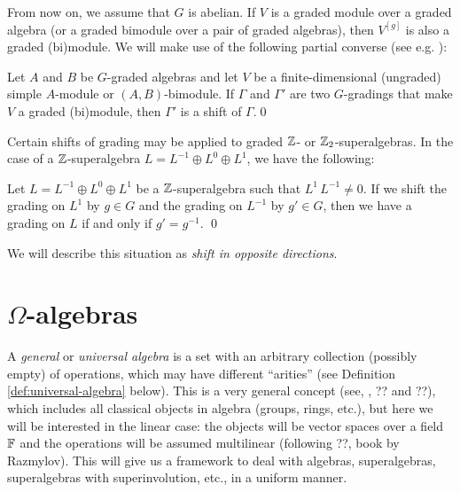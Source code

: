 From now on, we assume that $G$ is abelian.
If $V$ is a graded module over a graded algebra (or a graded bimodule over a pair of graded algebras), then $V^{[g]}$ is also a graded (bi)module. 
We will make use of the following partial converse (see e.g. \cite[Proposition 3.5]{paper-Qn}):

\begin{lemma}\label{lemma:simplebimodule}
	Let $A$ and $B$ be $G$-graded algebras and let $V$ be a finite-dimensional (ungraded) simple $A$-module or $(A,B)$-bimodule.  If $\Gamma$ and $\Gamma'$ are  two $G$-gradings that make $V$ a graded (bi)module, then $\Gamma'$ is a  shift of $\Gamma$.\qed
\end{lemma}

Certain shifts of grading may be applied to graded $\mathbb{Z}$- or $\mathbb{Z}_2$-superalgebras. In the case of a $\mathbb{Z}$-superalgebra $L=L^{-1}\oplus L^{0}\oplus L^{1}$, we have the following:

\begin{lemma}\label{lemma:opposite-directions}
	Let $L=L^{-1}\oplus L^0\oplus L^1$ be a $\mathbb{Z}$-superalgebra such that $L^1\, L^{-1}\neq 0$. If we shift the grading on $L^1$ by $g\in G$ and the grading on $L^{-1}$ by $g' \in G$, then we have a grading on $L$ if and only if $g' = g^{-1}$. \qed
\end{lemma}

We will describe this situation as \emph{shift in opposite directions}.

\section{$\Omega$-algebras}

A \emph{general} or \emph{universal algebra} is a set with an arbitrary collection (possibly empty) of operations, which may have different ``arities'' (see Definition \ref{def:universal-algebra} below). 
This is a very general concept (see, \eg, ?? and ??), which includes all classical objects in algebra (groups, rings, etc.), but here we will be interested in the linear case: the objects will be vector spaces over a field $\mathbb{F}$ and the operations will be assumed multilinear (following ??, book by Razmylov).
This will give us a framework to deal with algebras, superalgebras, superalgebras with superinvolution, etc., in a uniform manner.

